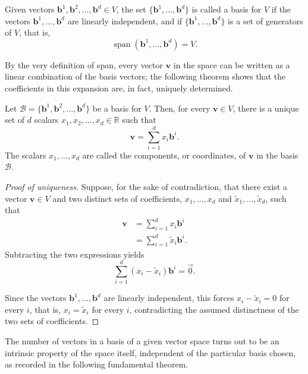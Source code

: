 \begin{definition}[Basis]
Given vectors $\mathbf{b}^1, \mathbf{b}^2, \dots, \mathbf{b}^d \in V$, the set $\{\mathbf{b}^1, \dots, \mathbf{b}^d\}$ is called a basis for $V$ if the vectors $\mathbf{b}^1, \dots, \mathbf{b}^d$ are linearly independent, and if $\{\mathbf{b}^1, \dots, \mathbf{b}^d\}$ is a set of generators of $V$, that is,
\[
\operatorname{span}(\mathbf{b}^1, \dots, \mathbf{b}^d) = V.
\]

\end{definition}

By the very definition of span, every vector $\mathbf{v}$ in the space can be written as a linear combination of the basis vectors; the following theorem shows that the coefficients in this expansion are, in fact, uniquely determined.

\begin{theorem}
Let $\mathcal{B} = \{\mathbf{b}^1, \mathbf{b}^2, \dots, \mathbf{b}^d\}$ be a basis for $V$. Then, for every $\mathbf{v} \in V$, there is a unique set of $d$ scalars $x_1, x_2, \dots, x_d \in \mathbb{R}$ such that
\[
\mathbf{v} = \sum_{i=1}^{d} x_i \mathbf{b}^i.
\]
The scalars $x_1, \dots, x_d$ are called the components, or coordinates, of $\mathbf{v}$ in the basis $\mathcal{B}$.
\end{theorem}

\begin{proof}[Proof of uniqueness]
Suppose, for the sake of contradiction, that there exist a vector $\mathbf{v} \in V$ and two distinct sets of coefficients, $x_1, \dots, x_d$ and $\tilde{x}_1, \dots, \tilde{x}_d$, such that
\[
\begin{aligned}
\mathbf{v} &= \sum_{i=1}^{d} x_i \mathbf{b}^i \\
&= \sum_{i=1}^{d} \tilde{x}_i \mathbf{b}^i.
\end{aligned}
\]
Subtracting the two expressions yields
\[
\sum_{i=1}^{d} (x_i - \tilde{x}_i) \mathbf{b}^i = \vec{0}.
\]

Since the vectors $\mathbf{b}^1, \dots, \mathbf{b}^d$ are linearly independent, this forces $x_i - \tilde{x}_i = 0$ for every $i$, that is, $x_i = \tilde{x}_i$ for every $i$, contradicting the assumed distinctness of the two sets of coefficients.
\end{proof}

The number of vectors in a basis of a given vector space turns out to be an intrinsic property of the space itself, independent of the particular basis chosen, as recorded in the following fundamental theorem.

